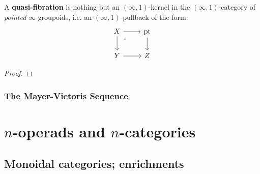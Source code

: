                 \begin{definition} \label{def: quasi_fibration}
                    A \textbf{quasi-fibration} is nothing but an $(\infty, 1)$-kernel in the $(\infty, 1)$-category of \textit{pointed} $\infty$-groupoids, i.e. an $(\infty, 1)$-pullback of the form:
                        $$
                            \begin{tikzcd}
                            	X & \pt \\
                            	Y & Z
                            	\arrow[from=1-1, to=2-1]
                            	\arrow[from=2-1, to=2-2]
                            	\arrow[from=1-2, to=2-2]
                            	\arrow[from=1-1, to=1-2]
                            	\arrow["\lrcorner"{anchor=center, pos=0.125}, draw=none, from=1-1, to=2-2]
                            \end{tikzcd}
                        $$
                \end{definition}
                
                \begin{theorem} \label{theorem: induced_long_exact_sequence_of_homotopy_groups}
                    
                \end{theorem}
                    \begin{proof}
                        
                    \end{proof}
            
            \subsubsection{The Mayer-Vietoris Sequence}
    
    \section{\texorpdfstring{$n$}{}-operads and \texorpdfstring{$n$}{}-categories}
        \subsection{Monoidal categories; enrichments}
